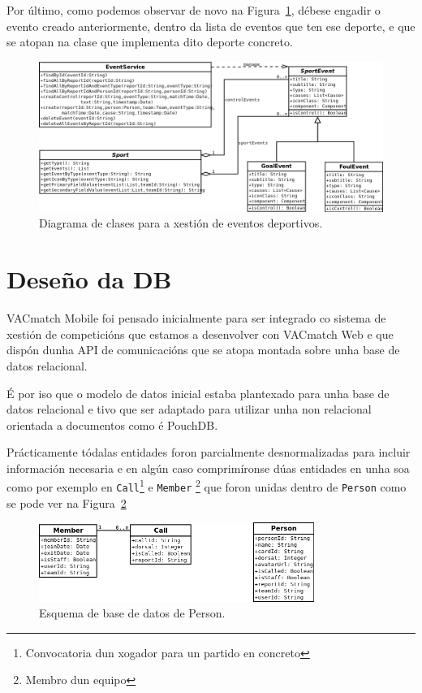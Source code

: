   Por último, como podemos observar de novo na 
Figura~\ref{fig:design:eventsdiagram}, débese engadir o evento creado 
anteriormente, dentro da lista de eventos que ten ese deporte, e que se atopan 
na clase que implementa dito deporte concreto.

    \begin{figure}[h!]
      \begin{center}
  \includegraphics[width=\textwidth]{./img/diagrams/events_diagram.png}
      \caption{Diagrama de clases para a xestión de eventos deportivos.}
      \label{fig:design:eventsdiagram}
      \end{center}
    \end{figure}


  \section{Deseño da DB}
  VACmatch Mobile foi pensado inicialmente para ser integrado co sistema de 
xestión de competicións que estamos a desenvolver con VACmatch Web e que dispón 
dunha API de comunicacións que se atopa montada sobre unha base de datos 
relacional.

  É por iso que o modelo de datos inicial estaba plantexado para unha base de 
datos relacional e tivo que ser adaptado para utilizar unha non relacional 
orientada a documentos como é PouchDB.

  Prácticamente tódalas entidades foron parcialmente desnormalizadas para 
incluir información necesaria e en algún caso comprimíronse dúas entidades en 
unha soa como por exemplo en \lstinline{Call}\footnote{Convocatoria dun xogador 
para un partido en concreto} e \lstinline{Member} \footnote{Membro dun equipo} 
que foron unidas 
dentro de \lstinline{Person} como se pode ver na 
Figura~\ref{fig:design:persondbdiagram}

    \begin{figure}[h!]
      \begin{center}
      \includegraphics[width=0.8\textwidth]{./img/diagrams/person_diagram.png}
      \caption{Esquema de base de datos de Person.}
      \label{fig:design:persondbdiagram}
      \end{center}
    \end{figure}

